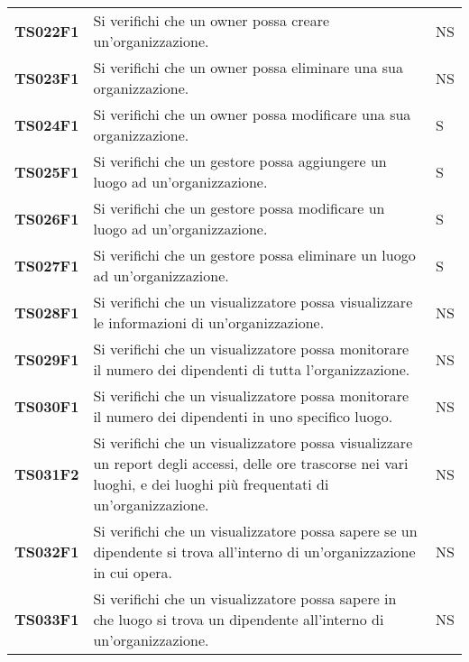 \documentclass[../../piano-di-qualifica.tex]{subfiles}
\begin{document}
\begin{longtable}[H]{>{\centering\bfseries}m{3cm} >{}m{10cm} >{\centering\arraybackslash}m{3cm}}
  TS022F1            & Si verifichi che un owner possa creare un'organizzazione. 
  & NS               \\

  TS023F1            & Si verifichi che un owner possa eliminare una sua organizzazione. 
  & NS               \\

  TS024F1            & Si verifichi che un owner possa modificare una sua organizzazione. 
  & S               \\
  
  TS025F1            & Si verifichi che un gestore possa aggiungere un luogo ad un'organizzazione. 
  & S               \\

  TS026F1            & Si verifichi che un gestore possa modificare un luogo ad un'organizzazione. 
  & S               \\

  TS027F1            & Si verifichi che un gestore possa eliminare un luogo ad un'organizzazione. 
  & S               \\

  TS028F1            & Si verifichi che un visualizzatore possa visualizzare le informazioni di un'organizzazione. 
  & NS               \\

  TS029F1            & Si verifichi che un visualizzatore possa monitorare il numero dei dipendenti di tutta l'organizzazione.
  & NS               \\

  TS030F1            & Si verifichi che un visualizzatore possa monitorare il numero dei dipendenti in uno specifico luogo.
  & NS               \\

  TS031F2            & Si verifichi che un visualizzatore possa visualizzare un report degli accessi, delle ore trascorse nei vari luoghi, e dei luoghi più frequentati di un'organizzazione.
  & NS               \\

  TS032F1            & Si verifichi che un visualizzatore possa sapere se un dipendente si trova all’interno di un’organizzazione in cui opera.
  & NS               \\

  TS033F1            & Si verifichi che un visualizzatore possa sapere in che luogo si trova un dipendente all'interno di un'organizzazione.
  & NS               \\


\end{longtable}
\end{document}
